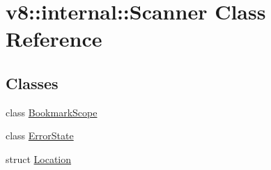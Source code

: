 \hypertarget{classv8_1_1internal_1_1Scanner}{}\section{v8\+:\+:internal\+:\+:Scanner Class Reference}
\label{classv8_1_1internal_1_1Scanner}
\subsection*{Classes}
\begin{DoxyCompactItemize}
\item 
class \mbox{\hyperlink{classv8_1_1internal_1_1Scanner_1_1BookmarkScope}{Bookmark\+Scope}}
\item 
class \mbox{\hyperlink{classv8_1_1internal_1_1Scanner_1_1ErrorState}{Error\+State}}
\item 
struct \mbox{\hyperlink{structv8_1_1internal_1_1Scanner_1_1Location}{Location}}
\end{DoxyCompactItemize}
